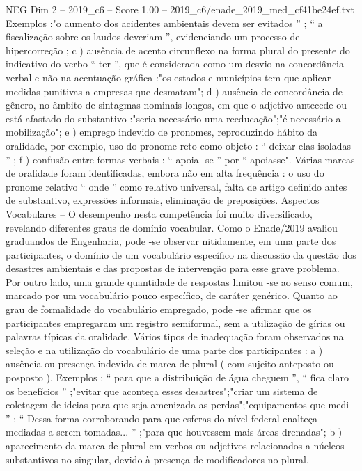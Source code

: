 \begin{textsample}{NEG Dim 2 – 2019\_c6 – Score 1.00 – 2019\_c6/enade\_2019\_med\_cf41be24ef.txt}
Exemplos :"o aumento dos acidentes ambientais devem ser evitados ” ; “ a fiscalização sobre os laudos deveriam ”, evidenciando um processo de hipercorreção ; c ) ausência de acento circunflexo na forma plural do presente do indicativo do verbo “ ter ”, que é considerada como um desvio na concordância verbal e não na acentuação gráfica :"os estados e municípios tem que aplicar medidas punitivas a empresas que desmatam"; d ) ausência de concordância de gênero, no âmbito de sintagmas nominais longos, em que o adjetivo antecede ou está afastado do substantivo :"seria necessário uma reeducação";"é necessário a mobilização"; e ) emprego indevido de pronomes, reproduzindo hábito da oralidade, por exemplo, uso do pronome reto como objeto : “ deixar elas isoladas ” ; f ) confusão entre formas verbais : “ apoia -se ” por “ apoiasse".
Várias marcas de oralidade foram identificadas, embora não em alta frequência : o uso do pronome relativo “ onde ” como relativo universal, falta de artigo definido antes de substantivo, expressões informais, eliminação de preposições.
Aspectos Vocabulares – O desempenho nesta competência foi muito diversificado, revelando diferentes graus de domínio vocabular.
Como o Enade/2019 avaliou graduandos de Engenharia, pode -se observar nitidamente, em uma parte dos participantes, o domínio de um vocabulário específico na discussão da questão dos desastres ambientais e das propostas de intervenção para esse grave problema.
Por outro lado, uma grande quantidade de respostas limitou -se ao senso comum, marcado por um vocabulário pouco específico, de caráter genérico.
Quanto ao grau de formalidade do vocabulário empregado, pode -se afirmar que os participantes empregaram um registro semiformal, sem a utilização de gírias ou palavras típicas da oralidade.
Vários tipos de inadequação foram observados na seleção e na utilização do vocabulário de uma parte dos participantes : a ) ausência ou presença indevida de marca de plural ( com sujeito anteposto ou posposto ).
Exemplos : “ para que a distribuição de água cheguem ”, “ fica claro os benefícios ” ;"evitar que aconteça esses desastres";"criar um sistema de coletagem de ideias para que seja amenizada as perdas";"equipamentos que medi ” ; “ Dessa forma corroborando para que esferas do nível federal enalteça mediadas a serem tomadas... ” ;"para que houvessem mais áreas drenadas"; b ) aparecimento da marca de plural em verbos ou adjetivos relacionados a núcleos substantivos no singular, devido à presença de modificadores no plural.

\end{textsample}
